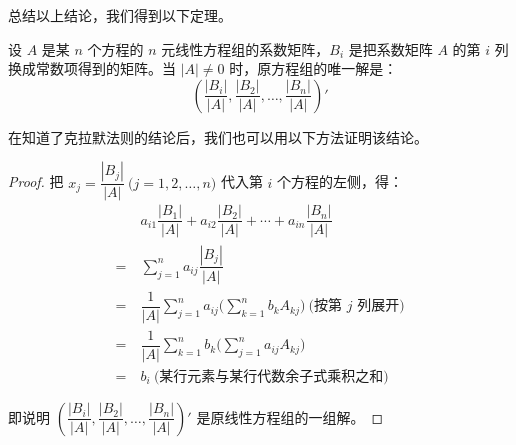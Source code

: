 总结以上结论，我们得到以下定理。

\begin{theorem}[克拉默法则]
	设 $A$ 是某 $n$ 个方程的 $n$ 元线性方程组的系数矩阵，$B_i$ 是把系数矩阵 $A$ 的第 $i$ 列换成常数项得到的矩阵。当 $|A| \ne 0$ 时，原方程组的唯一解是：
	$$
	\left( \dfrac{|B_i|}{|A|}, \dfrac{|B_2|}{|A|}, \ldots, \dfrac{|B_n|}{|A|} \right)'
	$$
\end{theorem}

在知道了克拉默法则的结论后，我们也可以用以下方法证明该结论。

\begin{proof}
	把 $x_j = \dfrac{|B_j|}{|A|} \pod{j = 1, 2, \ldots, n}$ 代入第 $i$ 个方程的左侧，得：
	$$
	\begin{aligned}&
		a_{i1} \dfrac{|B_1|}{|A|} + a_{i2} \dfrac{|B_2|}{|A|} + \cdots + a_{in} \dfrac{|B_n|}{|A|}
		\\=~&
		\sum\limits_{j = 1}^n a_{ij} \dfrac{|B_j|}{|A|}
		\\=~&
		\dfrac{1}{|A|} \sum\limits_{j = 1}^n a_{ij} \biggl( \sum\limits_{k = 1}^n b_k A_{kj} \biggr) \pod{\text{按第 $j$ 列展开}}
		\\=~&
		\dfrac{1}{|A|} \sum\limits_{k = 1}^n b_k \biggl( \sum\limits_{j = 1}^n a_{ij} A_{kj} \biggr)
		\\=~&
		b_i \pod{\text{某行元素与某行代数余子式乘积之和}}
	\end{aligned}
	$$

	即说明 $\left( \dfrac{|B_i|}{|A|}, \dfrac{|B_2|}{|A|}, \ldots, \dfrac{|B_n|}{|A|} \right)'$ 是原线性方程组的一组解。
\end{proof}
